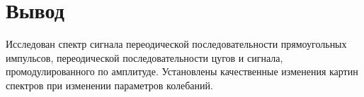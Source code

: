 \documentclass[a4paper,12pt]{article} %
\begin{document}
\section{Вывод}

Исследован спектр сигнала переодической последовательности прямоугольных импульсов, переодической последовательности цугов и сигнала, промодулированного по амплитуде. Установлены качественные изменения картин спектров при изменении параметров колебаний.
\end{document}
